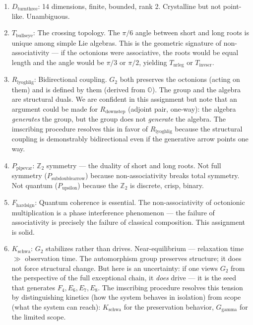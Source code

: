 \documentclass[12pt,a4paper]{article}
\begin{document}
\begin{enumerate}
    \item \textbf{$D_{\text{turnthree}}$}: 14 dimensions, finite, bounded, rank 2. Crystalline but not point-like. Unambiguous.
    \item \textbf{$T_{\text{bullseye}}$}: The crossing topology. The $\pi/6$ angle between short and long roots is unique among simple Lie algebras. This is the geometric signature of non-associativity --- if the octonions were associative, the roots would be equal length and the angle would be $\pi/3$ or $\pi/2$, yielding $T_{\text{nrleg}}$ or $T_{\text{invscr}}$.
    \item \textbf{$R_{\text{lyoghlig}}$}: Bidirectional coupling. $G_2$ both preserves the octonions (acting on them) and is defined by them (derived from $\mathbb{O}$). The group and the algebra are structural duals. We are confident in this assignment but note that an argument could be made for $R_{\text{downstep}}$ (adjoint pair, one-way): the algebra \emph{generates} the group, but the group does not \emph{generate} the algebra. The imscribing procedure resolves this in favor of $R_{\text{lyoghlig}}$ because the structural coupling is demonstrably bidirectional even if the generative arrow points one way.
    \item \textbf{$P_{\text{pipevar}}$}: $\mathbb{Z}_2$ symmetry --- the duality of short and long roots. Not full symmetry ($P_{\text{subdoublearrow}}$) because non-associativity breaks total symmetry. Not quantum ($P_{\text{upsilon}}$) because the $\mathbb{Z}_2$ is discrete, crisp, binary.
    \item \textbf{$F_{\text{hardsign}}$}: Quantum coherence is essential. The non-associativity of octonionic multiplication is a phase interference phenomenon --- the failure of associativity is precisely the failure of classical composition. This assignment is solid.
    \item \textbf{$K_{\text{schwa}}$}: $G_2$ stabilizes rather than drives. Near-equilibrium --- relaxation time $\gg$ observation time. The automorphism group preserves structure; it does not force structural change. But here is an uncertainty: if one views $G_2$ from the perspective of the full exceptional chain, it \emph{does} drive --- it is the seed that generates $F_4, E_6, E_7, E_8$. The imscribing procedure resolves this tension by distinguishing kinetics (how the system behaves in isolation) from scope (what the system can reach): $K_{\text{schwa}}$ for the preservation behavior, $G_{\text{gamma}}$ for the limited scope.

\end{enumerate}
\end{document}
